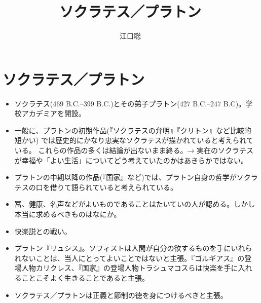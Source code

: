 \documentclass[dvipdfmx]{bxjsarticle}
\author{江口聡}
\title{ソクラテス／プラトン}
\begin{document}
\maketitle


\section{ソクラテス／プラトン}

\begin{itemize}

\item ソクラテス(469 B.C.--399 B.C.)とその弟子プラトン(427 B.C.--247 B.C)。学校アカデミアを開設。
\item 一般に、プラトンの初期作品(『ソクラテスの弁明』『クリトン』など比較的短かい) では歴史的にかなり忠実なソクラテスが描かれていると考えられている。 これらの作品の多くは結論が出ないまま終る。→ 実在のソクラテスが幸福や「よい生活」についてどう考えていたのかはあきらかではない。
\item プラトンの中期以降の作品(『国家』など)では、プラトン自身の哲学がソクラテスの口を借りて語られていると考えられている。

     \end{itemize}

\begin{itemize}

\item 冨、健康、名声などがよいものであることはたいていの人が認める。しかし本当に求めるべきものはなにか。
\item 快楽説との戦い。
\item プラトン『リュシス』。ソフィストは人間が自分の欲するものを手にいれられないことは、当人にとってよいことではないと主張。『ゴルギアス』の登場人物カリクレス、『国家』の登場人物トラシュマコスらは快楽を手に入れることこそよく生きることであると主張。
\item ソクラテス／プラトンは正義と節制の徳を身につけるべきと主張。
\end{itemize}
\end{document}
